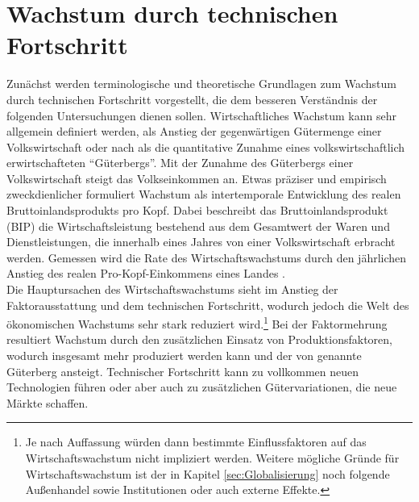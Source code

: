\chapter[Wachstum durch technischen Fortschritt]{Wachstum durch technischen Fortschritt}\label{Wachstum}

Zunächst werden terminologische und theoretische Grundlagen zum Wachstum durch technischen Fortschritt vorgestellt, die dem besseren Verständnis der folgenden Untersuchungen dienen sollen. Wirtschaftliches Wachstum kann sehr allgemein definiert werden, als Anstieg der gegenwärtigen Gütermenge einer Volkswirtschaft oder nach \cite[S.1]{Frenkel.1999} als die quantitative Zunahme eines volkswirtschaftlich erwirtschafteten "`Güterbergs"'. Mit der Zunahme des Güterbergs einer Volkswirtschaft steigt das Volkseinkommen an. Etwas präziser und empirisch zweckdienlicher formuliert \cite[Kapitel 16,S.273]{Bofinger.2015} Wachstum als intertemporale Entwicklung des realen Bruttoinlandsprodukts pro Kopf. Dabei beschreibt das Bruttoinlandsprodukt (BIP) die Wirtschaftsleistung bestehend aus dem Gesamtwert der Waren und Dienstleistungen, die innerhalb eines Jahres von einer Volkswirtschaft erbracht werden. Gemessen wird die Rate des Wirtschaftswachstums durch den jährlichen Anstieg des realen Pro-Kopf-Einkommens eines Landes \cite[Kapitel 16,S.273]{Bofinger.2015}.\\
%
Die Hauptursachen des Wirtschaftswachstums sieht \cite[S.269]{Gandolfo.1998} im Anstieg der Faktor\-ausstattung und dem technischen Fortschritt, wodurch jedoch die Welt des ökonomischen Wachstums sehr stark reduziert wird.\footnote{Je nach Auffassung würden dann bestimmte Einflussfaktoren auf das Wirtschaftswachstum nicht impliziert werden. Weitere mögliche Gründe für Wirtschaftswachstum ist der in Kapitel \ref{sec:Globalisierung} noch folgende Außenhandel sowie Institutionen oder auch externe Effekte.} Bei der Faktormehrung resultiert Wachstum durch den zusätzlichen Einsatz von Produktionsfaktoren, wodurch insgesamt mehr produziert werden kann und der von \cite[S.1]{Frenkel.1999} genannte Güterberg ansteigt. Technischer Fortschritt kann zu vollkommen neuen Technologien führen oder aber auch zu zusätzlichen Gütervariationen, die neue Märkte schaffen.\\
%
